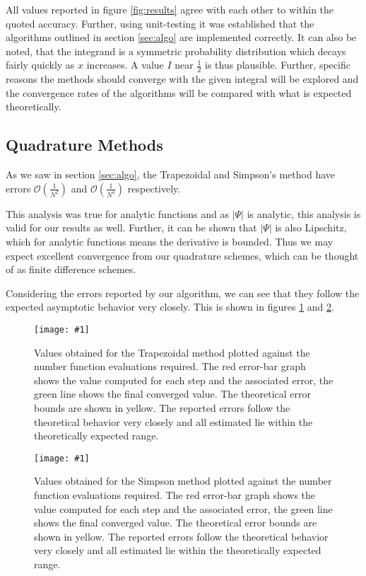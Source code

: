 \documentclass[10pt, a4paper]{article}
\newcommand{\plot}[3]{\begin{figure}[ht]\centering\texttt{[image: \#1]}\caption{#2}\label{#3}\end{figure}}
\begin{document}
  All values reported in figure \ref{fig:results} agree with each other to within the quoted accuracy.
  Further, using unit-testing it was established that the algorithms outlined in section \ref{sec:algo}
  are implemented correctly. It can also be noted, that the integrand is a symmetric probability distribution
  which decays fairly quickly as $x$ increases. A value $I$ near $\frac12$ is thus plausible. Further,
  specific reasons the methods should converge with the given integral will be explored and the
  convergence rates of the algorithms will be compared with what is expected theoretically.

  \subsection{Quadrature Methods}
  As we saw in section \ref{sec:algo}, the Trapezoidal and Simpson's method have errors
  $\mathcal{O}\left( \frac{1}{N^2} \right)$ and $\mathcal{O}\left( \frac{1}{N^4} \right)$ respectively.

  This analysis was true for analytic functions and as $|\Psi|$ is analytic, this analysis is valid
  for our results as well. Further, it can be shown that $|\Psi|$ is also Lipschitz, which for analytic
  functions means the derivative is bounded. Thus we may expect excellent convergence from our
  quadrature schemes, which can be thought of as finite difference schemes.

  Considering the errors reported by our algorithm, we can see that they follow the expected asymptotic
  behavior very closely. This is shown in figures \ref{fig:trap} and \ref{fig:simp}.

  \plot{proj-trap-accuracy}{
    Values obtained for the Trapezoidal method plotted against the number function evaluations required. The red
    error-bar graph shows the value computed for each step and the associated error, the green line
    shows the final converged value. The theoretical error bounds are shown in yellow. The reported errors
    follow the theoretical behavior very closely and all estimated lie within the theoretically expected range.
  }{fig:trap}

  \plot{proj-simp-accuracy}{
    Values obtained for the Simpson method plotted against the number function evaluations required. The red
    error-bar graph shows the value computed for each step and the associated error, the green line
    shows the final converged value. The theoretical error bounds are shown in yellow. The reported errors
    follow the theoretical behavior very closely and all estimated lie within the theoretically expected range.
  }{fig:simp}
\end{document}
